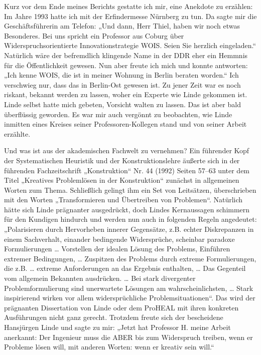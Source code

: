 \documentclass[11pt,a4paper]{article}
\begin{document}
Kurz vor dem Ende meines Berichts gestatte ich mir, eine Anekdote zu erzählen:
Im Jahre 1993 hatte ich mit der Erfindermesse Nürnberg zu tun.  Da sagte mir
die Geschäftsführerin am Telefon: „Und dann, Herr Thiel, haben wir noch etwas
Besonderes. Bei uns spricht ein Professor aus Coburg über
{\glq}Widerspruchsorientierte Innovationstrategie WOIS{\grq}. Seien Sie
herzlich eingeladen.“ Natürlich wäre der befremdlich klingende Name in der DDR
eher ein Hemmnis für die Öffentlichkeit gewesen. Nun aber freute ich mich und
konnte antworten: „Ich kenne WOIS, die ist in meiner Wohnung in Berlin beraten
worden.“ Ich verschwieg nur, dass das in Berlin-Ost gewesen ist. Zu jener Zeit
war es noch riskant, bekannt werden zu lassen, woher ein Experte wie Linde
gekommen ist. Linde selbst hatte mich gebeten, Vorsicht walten zu lassen. Das
ist aber bald überflüssig geworden. Es war mir auch vergönnt zu beobachten, wie
Linde inmitten eines Kreises seiner Professoren-Kollegen stand und von seiner
Arbeit erzählte.

Und was ist aus der akademischen Fachwelt zu vernehmen? Ein führender Kopf der
Systematischen Heuristik und der Konstruktionslehre äußerte sich in der
führenden Fachzeitschrift „Konstruktion“ Nr. 44 (1992) Seiten 57–63 unter dem
Titel „Kreatives Problemlösen in der Konstruktion“ zunächst in allgemeinen
Worten zum Thema. Schließlich gelingt ihm ein Set von Leitsätzen, überschrieben
mit den Worten „Transformieren und Übertreiben von Problemen“. Natürlich hätte
sich Linde prägnanter ausgedrückt, doch Lindes Kernaussagen schimmern für den
Kundigen hindurch und werden nun auch in folgenden Regeln angedeutet:
„Polarisieren durch Hervorheben innerer Gegensätze, z.B. echter Diskrepanzen in
einem Sachverhalt, einander bedingende Widersprüche, scheinbar paradoxe
Formulierungen {\ldots} Vorstellen der idealen Lösung des Problems, Einführen
extremer Bedingungen, {\ldots} Zuspitzen des Problems durch extreme
Formulierungen, die z.B. {\ldots} extreme Anforderungen an das Ergebnis
enthalten, {\ldots} Das Gegenteil vom allgemein Bekannten ausdrücken. {\ldots}
Bei stark divergenter Problemformulierung sind unerwartete Lösungen am
wahrscheinlichsten, {\ldots} Stark inspirierend wirken vor allem
widersprüchliche Problemsituationen“. Das wird der prägnanten Dissertation von
Linde oder dem ProHEAL mit ihren konkreten Ausführungen nicht ganz gerecht.
Trotzdem freute sich der bescheidene Hansjürgen Linde und sagte zu mir: „Jetzt
hat Professor H. meine Arbeit anerkannt: Der Ingenieur muss die ABER bis zum
Widerspruch treiben, wenn er Probleme lösen will, mit anderen Worten: wenn er
kreativ sein will.“
\end{document}
